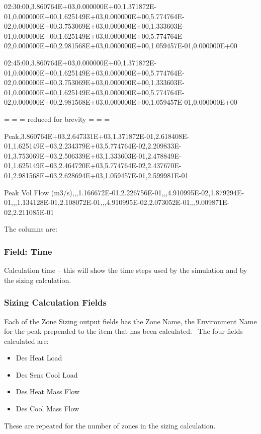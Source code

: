 02:30:00,3.860764E+03,0.000000E+00,1.371872E-01,0.000000E+00,1.625149E+03,0.000000E+00,5.774764E-02,0.000000E+00,3.753069E+03,0.000000E+00,1.333603E-01,0.000000E+00,1.625149E+03,0.000000E+00,5.774764E-02,0.000000E+00,2.981568E+03,0.000000E+00,1.059457E-01,0.000000E+00

02:45:00,3.860764E+03,0.000000E+00,1.371872E-01,0.000000E+00,1.625149E+03,0.000000E+00,5.774764E-02,0.000000E+00,3.753069E+03,0.000000E+00,1.333603E-01,0.000000E+00,1.625149E+03,0.000000E+00,5.774764E-02,0.000000E+00,2.981568E+03,0.000000E+00,1.059457E-01,0.000000E+00

= = = reduced for brevity = = =

Peak,3.860764E+03,2.647331E+03,1.371872E-01,2.618408E-01,1.625149E+03,2.234379E+03,5.774764E-02,2.209833E-01,3.753069E+03,2.506339E+03,1.333603E-01,2.478849E-01,1.625149E+03,2.464720E+03,5.774764E-02,2.437670E-01,2.981568E+03,2.628694E+03,1.059457E-01,2.599981E-01

Peak Vol Flow (m3/s),,,1.166672E-01,2.226756E-01,,,4.910995E-02,1.879294E-01,,,1.134128E-01,2.108072E-01,,,4.910995E-02,2.073052E-01,,,9.009871E-02,2.211085E-01

The columns are:

\subsubsection{Field: Time}\label{field-time-000}

Calculation time -- this will show the time steps used by the simulation and by the sizing calculation.

\subsubsection{Sizing Calculation Fields}\label{sizing-calculation-fields}

Each of the Zone Sizing output fields has the Zone Name, the Environment Name for the peak prepended to the item that has been calculated.~ The four fields calculated are:

\begin{itemize}
\item
  Des Heat Load
\item
  Des Sens Cool Load
\item
  Des Heat Mass Flow
\item
  Des Cool Mass Flow
\end{itemize}

These are repeated for the number of zones in the sizing calculation.

